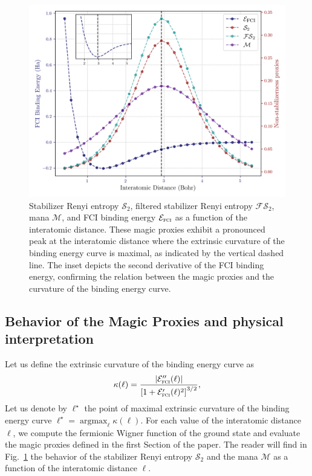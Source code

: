 \documentclass[aps, prl, twocolumn, groupedaddress, reprint, floatfix, nofootinbib, longbibliography]{revtex4-2}
\DeclareMathOperator*{\argmax}{argmax}
\begin{document}
        \begin{figure}[ht]
        \centering
            \includegraphics[width=1.0
            \textwidth]{figures/magic_vs_distance.png}
            \caption{Stabilizer Renyi entropy $\mathcal S_2$, filtered stabilizer Renyi entropy $\mathcal{FS}_2$, mana $\mathcal M$, and FCI binding energy $\mathcal E_\textsc{fci}$ as a function of the interatomic distance. These magic proxies exhibit a pronounced peak at the interatomic distance where the extrinsic curvature of the binding energy curve is maximal, as indicated by the vertical dashed line. The inset depicts the second derivative of the FCI binding energy, confirming the relation between the magic proxies and the curvature of the binding energy curve.}
        \label{fig:magic_vs_distance}
        \end{figure}

    \subsection{Behavior of the Magic Proxies and physical interpretation}

        Let us define the extrinsic curvature of the binding energy curve as
        \begin{equation}
            \kappa(\ell) = \frac{\left|\mathcal E_\textsc{fci}''(\ell)\right|}{\left[1+\mathcal E_\textsc{fci}'(\ell)^2\right]^{3/2}},
        \end{equation}
        Let us denote by $\ell^\star$ the point of maximal extrinsic curvature of the binding energy curve $\ell^\star = \argmax_{\ell} \kappa(\ell)$.
        For each value of the interatomic distance $\ell$, we compute the fermionic Wigner function of the ground state and evaluate the magic proxies defined in the first Section of the paper. The reader will find in Fig.~\ref{fig:magic_vs_distance} the behavior of the stabilizer Renyi entropy $\mathcal S_2$ and the mana $\mathcal M$ as a function of the interatomic distance $\ell$.
\end{document}
